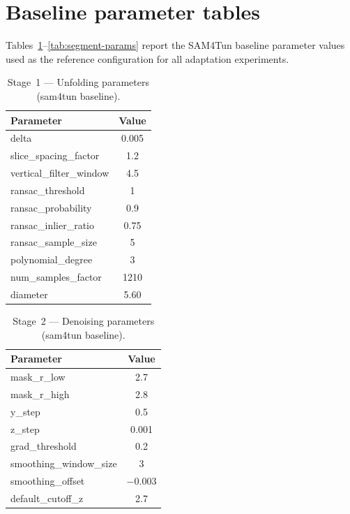 \documentclass[a4paper,fleqn]{cas-dc}
\begin{document}
{\FloatBarrier
\setcounter{section}{0}
\renewcommand{\thesection}{\arabic{section}}
\renewcommand{\thesubsection}{\thesection.\arabic{subsection}}

\section{Baseline parameter tables}\label{app:params}
Tables~\ref{tab:unfold-params}--\ref{tab:segment-params} report the SAM4Tun baseline parameter values used as the reference configuration for all adaptation experiments.

\begin{table}[ht]
\caption{Stage~1 --- Unfolding parameters (sam4tun baseline).}\label{tab:unfold-params}
\begin{tabular*}{\tblwidth}{@{} l c @{}}
\toprule
Parameter & Value \\
\midrule
delta & 0.005 \\
slice\_spacing\_factor & 1.2 \\
vertical\_filter\_window & 4.5 \\
ransac\_threshold & 1 \\
ransac\_probability & 0.9 \\
ransac\_inlier\_ratio & 0.75 \\
ransac\_sample\_size & 5 \\
polynomial\_degree & 3 \\
num\_samples\_factor & 1210 \\
diameter & 5.60 \\
\bottomrule
\end{tabular*}
\end{table}

\begin{table}[ht]
\caption{Stage~2 --- Denoising parameters (sam4tun baseline).}\label{tab:denoise-params}
\begin{tabular*}{\tblwidth}{@{} l c @{}}
\toprule
Parameter & Value \\
\midrule
mask\_r\_low & 2.7 \\
mask\_r\_high & 2.8 \\
y\_step & 0.5 \\
z\_step & 0.001 \\
grad\_threshold & 0.2 \\
smoothing\_window\_size & 3 \\
smoothing\_offset & $-0.003$ \\
default\_cutoff\_z & 2.7 \\
\bottomrule
\end{tabular*}
\end{table}

}
\end{document}
